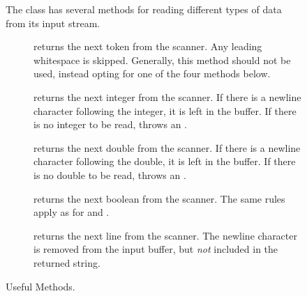 \begin{figure}[tp]
  \small
  \begin{tcolorbox}[title=Scanner Methods]
    The  class has several methods for reading different types of data from its input stream.
    \vspace{2ex}
  \begin{description}
    \item [] returns the next token from the scanner. Any leading whitespace is skipped. Generally, this method should not be used, instead opting for one of the four methods below.
    \item [] returns the next integer from the scanner. If there is a newline character following the integer, it is left in the buffer. If there is no integer to be read, throws an . 
    \item [] returns the next double from the scanner. If there is a newline character following the double, it is left in the buffer. If there is no double to be read, throws an .
    \item [] returns the next boolean from the scanner. The same rules apply as for  and .
    \item [] returns the next line from the scanner. The newline character is removed from the input buffer, but \emph{not} included in the returned string. 
  \end{description}
\end{tcolorbox}
  \caption{Useful  Methods.}
  \label{fig:scin}
\end{figure}


